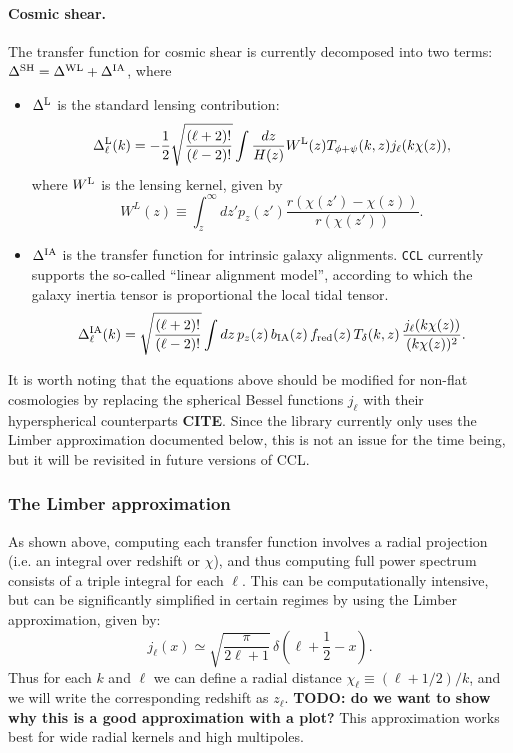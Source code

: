 \documentclass[\docopts]{\docclass}
\begin{document}
\paragraph{\bf Cosmic shear.} The transfer function for cosmic shear is currently decomposed into two terms: $\Delta^{\rm SH}=\Delta^{\rm WL}+\Delta^{\rm IA}$, where
\begin{itemize}
  \item $\Delta^{\rm L}$ is the standard lensing contribution:
        \begin{equation}
          \Delta_\ell^{\rm L}(k)=-\frac{1}{2}\sqrt{\frac{(\ell+2)!}{(\ell-2)!}}\int \frac{dz}{H(z)} W^{\rm L}(z) T_{\phi+\psi}(k,z) j_\ell(k\chi(z)),
        \end{equation}
        where $W^{\rm L}$ is the lensing kernel, given by
        \begin{equation}
          W^L(z)\equiv\int_z^\infty dz' p_z(z')\frac{r(\chi(z')-\chi(z))}{r(\chi(z'))}.
        \end{equation}
  \item $\Delta^{\rm IA}$ is the transfer function for intrinsic galaxy alignments. {\tt CCL} currently supports the so-called ``linear alignment model'', according to which the galaxy inertia tensor is proportional the local tidal tensor.
        \begin{equation}
          \Delta_\ell^{\rm IA}(k)=\sqrt{\frac{(\ell+2)!}{(\ell-2)!}}\int dz\,p_z(z)\,b_{\rm IA}(z)\,f_{\rm red}(z)\,T_\delta(k,z)\,\frac{j_\ell(k\chi(z))}{(k\chi(z))^2}.
        \end{equation}
\end{itemize}

It is worth noting that the equations above should be modified for non-flat cosmologies by replacing the spherical Bessel functions $j_\ell$ with their hyperspherical counterparts {\bf CITE}. Since the library currently only uses the Limber approximation documented below, this is not an issue for the time being, but it will be revisited in future versions of CCL.

\subsubsection{The Limber approximation}
As shown above, computing each transfer function involves a radial projection (i.e. an integral over redshift or $\chi$), and thus computing full power spectrum consists of a triple integral for each $\ell$. This can be computationally intensive, but can be significantly simplified in certain regimes by using the Limber approximation, given by:
\begin{equation}
 j_\ell(x)\simeq\sqrt{\frac{\pi}{2\ell+1}}\,\delta\left(\ell+\frac{1}{2}-x\right).
\end{equation}
Thus for each $k$ and $\ell$ we can define a radial distance $\chi_\ell\equiv(\ell+1/2)/k$, and we will write the corresponding redshift as $z_\ell$. {\bf TODO: do we want to show why this is a good approximation with a plot?} This approximation works best for wide radial kernels and high multipoles.
\end{document}
